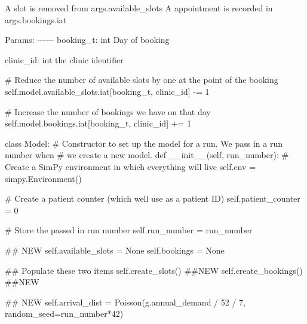 \documentclass[
  letterpaper,
  DIV=11,
  numbers=noendperiod]{scrreprt}
\newenvironment{Shaded}{\begin{snugshade}}{\end{snugshade}}
\newcommand{\CommentTok}[1]{\textcolor[rgb]{0.37,0.37,0.37}{#1}}
\newcommand{\DecValTok}[1]{\textcolor[rgb]{0.68,0.00,0.00}{#1}}
\newcommand{\FunctionTok}[1]{\textcolor[rgb]{0.28,0.35,0.67}{#1}}
\newcommand{\KeywordTok}[1]{\textcolor[rgb]{0.00,0.23,0.31}{#1}}
\newcommand{\NormalTok}[1]{\textcolor[rgb]{0.00,0.23,0.31}{#1}}
\newcommand{\OperatorTok}[1]{\textcolor[rgb]{0.37,0.37,0.37}{#1}}
\newcommand{\VariableTok}[1]{\textcolor[rgb]{0.07,0.07,0.07}{#1}}
\newcommand*\circled[1]{\tikz[baseline=(char.base)]{
          \node[shape=circle,draw,inner sep=1pt] (char) {{\scriptsize#1}};}}
\begin{document}
\begin{tcolorbox}
\begin{Shaded}
\begin{Highlighting}[]
\CommentTok{        A slot is removed from args.available\_slots}
\CommentTok{        A appointment is recorded in args.bookings.iat}

\CommentTok{        Params:}
\CommentTok{        {-}{-}{-}{-}{-}{-}}
\CommentTok{        booking\_t: int}
\CommentTok{            Day of booking}

\CommentTok{        clinic\_id: int}
\CommentTok{            the clinic identifier}
\CommentTok{        \textquotesingle{}\textquotesingle{}\textquotesingle{}}

        \CommentTok{\# Reduce the number of available slots by one at the point of the booking}
        \VariableTok{self}\NormalTok{.model.available\_slots.iat[booking\_t, clinic\_id] }\OperatorTok{{-}=} \DecValTok{1}

        \CommentTok{\# Increase the number of bookings we have on that day}
        \VariableTok{self}\NormalTok{.model.bookings.iat[booking\_t, clinic\_id] }\OperatorTok{+=} \DecValTok{1}

\KeywordTok{class}\NormalTok{ Model:}
    \CommentTok{\# Constructor to set up the model for a run.  We pass in a run number when}
    \CommentTok{\# we create a new model.}
    \KeywordTok{def} \FunctionTok{\_\_init\_\_}\NormalTok{(}\VariableTok{self}\NormalTok{, run\_number):}
        \CommentTok{\# Create a SimPy environment in which everything will live}
        \VariableTok{self}\NormalTok{.env }\OperatorTok{=}\NormalTok{ simpy.Environment()}

        \CommentTok{\# Create a patient counter (which we\textquotesingle{}ll use as a patient ID)}
        \VariableTok{self}\NormalTok{.patient\_counter }\OperatorTok{=} \DecValTok{0}

        \CommentTok{\# Store the passed in run number}
        \VariableTok{self}\NormalTok{.run\_number }\OperatorTok{=}\NormalTok{ run\_number}

        \CommentTok{\#\# NEW}
        \VariableTok{self}\NormalTok{.available\_slots }\OperatorTok{=} \VariableTok{None}
        \VariableTok{self}\NormalTok{.bookings }\OperatorTok{=} \VariableTok{None}

        \CommentTok{\#\# Populate these two items}
        \VariableTok{self}\NormalTok{.create\_slots() }\CommentTok{\#\#NEW}
        \VariableTok{self}\NormalTok{.create\_bookings() }\CommentTok{\#\#NEW}


        \CommentTok{\#\# NEW}
        \VariableTok{self}\NormalTok{.arrival\_dist }\OperatorTok{=}\NormalTok{ Poisson(g.annual\_demand }\OperatorTok{/} \DecValTok{52} \OperatorTok{/} \DecValTok{7}\NormalTok{, }\hspace*{\fill}\NormalTok{\circled{1}}
\NormalTok{                                    random\_seed}\OperatorTok{=}\NormalTok{run\_number}\OperatorTok{*}\DecValTok{42}\NormalTok{) }\hspace*{\fill}\NormalTok{\circled{2}}


\end{Highlighting}
\end{Shaded}
\end{tcolorbox}
\end{document}
